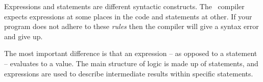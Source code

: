 Expressions and statements are different syntactic constructs. The \csharp\ compiler expects expressions at some places in the code and statements at other. If your program does not adhere to these \textsl{rules} then the compiler will give a syntax error and give up.

The most important difference is that an expression -- as opposed to a statement -- evaluates to a value. The main structure of logic is made up of statements, and expressions are used to describe intermediate results within specific statements.

